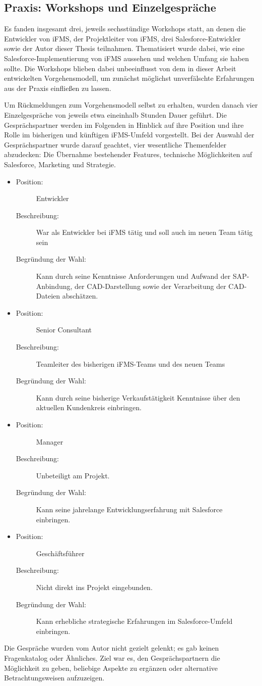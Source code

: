\subsection{Praxis: Workshops und Einzelgespräche}
Es fanden insgesamt drei, jeweils sechsstündige Workshops statt, an denen die 
Entwickler von iFMS, der Projektleiter von iFMS, drei 
Salesforce-Entwickler sowie der Autor dieser Thesis teilnahmen. Thematisiert 
wurde dabei, wie eine Salesforce-Implementierung von iFMS aussehen und welchen 
Umfang sie haben sollte. Die Workshops blieben dabei unbeeinflusst von dem in 
dieser Arbeit entwickelten Vorgehensmodell, um zunächst möglichst unverfälschte 
Erfahrungen aus der Praxis einfließen zu lassen.

Um Rückmeldungen zum Vorgehensmodell selbst zu erhalten, wurden danach 
vier Einzelgespräche von jeweils etwa eineinhalb Stunden Dauer geführt. 
Die Gesprächspartner werden im Folgenden in Hinblick auf ihre Position und 
ihre Rolle im bisherigen und künftigen iFMS-Umfeld vorgestellt. Bei 
der Auswahl der Gesprächspartner wurde darauf geachtet, vier 
wesentliche Themenfelder abzudecken: Die Übernahme bestehender 
Features, technische Möglichkeiten auf Salesforce, Marketing und 
Strategie. 

\newcommand{\person}[3]{\begin{description}
                        	\item[Position:] #1
				\item[Beschreibung:] #2
                        	\item[Begründung der Wahl:] #3
                        \end{description}
}
\begin{itemize}
\item \person{Entwickler}{War als Entwickler bei iFMS tätig und soll auch im 
neuen Team tätig sein}{Kann durch seine 
Kenntnisse Anforderungen und Aufwand der SAP-Anbindung, der CAD-Darstellung 
sowie der Verarbeitung der CAD-Dateien abschätzen.}
\item \person{Senior Consultant}{Teamleiter des bisherigen iFMS-Teams und des 
neuen Teams}{Kann durch seine bisherige Verkaufstätigkeit Kenntnisse über den 
 aktuellen Kundenkreis einbringen.}
\item \person{Manager}{Unbeteiligt am Projekt.}{Kann seine jahrelange 
Entwicklungserfahrung mit Salesforce einbringen.}
\item \person{Geschäftsführer}{Nicht direkt ins Projekt eingebunden.}{Kann 
erhebliche strategische Erfahrungen im Salesforce-Umfeld einbringen.}
\end{itemize}
Die Gespräche wurden vom Autor nicht gezielt gelenkt; es gab keinen 
Fragenkatalog oder Ähnliches. Ziel war es, den Gesprächspartnern die 
Möglichkeit zu geben, beliebige Aspekte zu ergänzen oder alternative 
Betrachtungsweisen aufzuzeigen.
\label{cha:praxis}